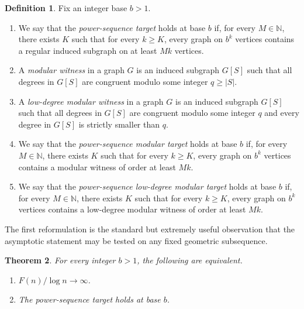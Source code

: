 \documentclass[11pt]{amsart}
\newtheorem{theorem}{Theorem}[section]
\theoremstyle{definition}
\newtheorem{definition}[theorem]{Definition}
\newcommand{\N}{\mathbb{N}}
\begin{document}
\begin{definition}
Fix an integer base $b>1$.
\begin{enumerate}
  \item We say that the \emph{power-sequence target} holds at base $b$ if, for every $M \in \N$,
    there exists $K$ such that for every $k \ge K$, every graph on $b^k$ vertices contains a
    regular induced subgraph on at least $Mk$ vertices.
  \item A \emph{modular witness} in a graph $G$ is an induced subgraph $G[S]$ such that all degrees
    in $G[S]$ are congruent modulo some integer $q \ge |S|$.
  \item A \emph{low-degree modular witness} in a graph $G$ is an induced subgraph $G[S]$ such that
    all degrees in $G[S]$ are congruent modulo some integer $q$ and every degree in $G[S]$ is
    strictly smaller than $q$.
  \item We say that the \emph{power-sequence modular target} holds at base $b$ if, for every
    $M \in \N$, there exists $K$ such that for every $k \ge K$, every graph on $b^k$ vertices
    contains a modular witness of order at least $Mk$.
  \item We say that the \emph{power-sequence low-degree modular target} holds at base $b$ if, for
    every $M \in \N$, there exists $K$ such that for every $k \ge K$, every graph on $b^k$
    vertices contains a low-degree modular witness of order at least $Mk$.
\end{enumerate}
\end{definition}

The first reformulation is the standard but extremely useful observation that the asymptotic
statement may be tested on any fixed geometric subsequence.

\begin{theorem}\label{thm:power-sequence}
For every integer $b>1$, the following are equivalent.
\begin{enumerate}
  \item $F(n)/\log n \to \infty$.
  \item The power-sequence target holds at base $b$.
\end{enumerate}
\end{theorem}
\end{document}

